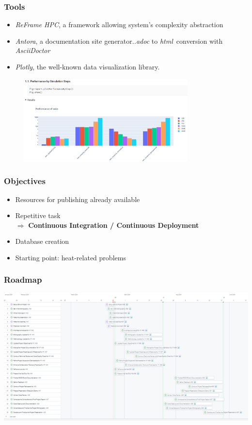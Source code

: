\documentclass[10pt]{beamer}
\begin{document}
\begin{frame}
    \frametitle{\textbf{Tools}}
    \begin{itemize}
        \addtolength{\itemsep}{10pt}
        \item \textit{ReFrame HPC}, a framework allowing system's complexity abstraction
        \item \textit{Antora}, a documentation site generator.\newline \textit{.adoc} to \textit{html}\ conversion with \textit{AsciiDoctor}
        \item \textit{Plotly}, the well-known data visualization library.
    \end{itemize}
    \begin{figure}
        \centering
        \includegraphics[width=0.8\textwidth]{../../illustrations/benchmarking-graphics.png}
      \end{figure}
\end{frame}

\begin{frame}
    \frametitle{\textbf{Objectives}}
    \begin{itemize}
        \addtolength{\itemsep}{10pt}
        \item Resources for publishing already available
        \item Repetitive task\\
                [0.2cm]
                $\Rightarrow$ \textbf{Continuous Integration / Continuous Deployment}
        \item Database creation
        \item Starting point: heat-related problems
    \end{itemize}
\end{frame}

\begin{frame}
    \frametitle{\textbf{Roadmap}}
    \includegraphics[width=\textwidth]{../../roadmap/roadmapv0-full.png}
\end{frame}
\end{document}
